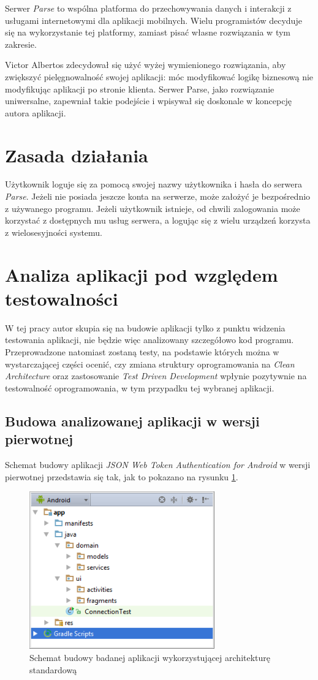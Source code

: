 Serwer \textit{Parse} to wspólna platforma do przechowywania danych i interakcji z usługami internetowymi dla aplikacji mobilnych. Wielu programistów decyduje się na wykorzystanie tej platformy, zamiast pisać własne rozwiązania w tym zakresie.

Victor Albertos zdecydował się użyć wyżej wymienionego rozwiązania, aby zwiększyć pielęgnowalność swojej aplikacji: móc modyfikować logikę biznesową nie modyfikując aplikacji po stronie klienta. Serwer Parse, jako rozwiązanie uniwersalne, zapewniał takie podejście i wpisywał się doskonale w koncepcję autora aplikacji.

\section{Zasada działania}
Użytkownik loguje się za pomocą swojej nazwy użytkownika i hasła do serwera \textit{Parse}. Jeżeli nie posiada jeszcze konta na serwerze, może założyć je bezpośrednio z używanego programu. Jeżeli użytkownik istnieje, od chwili zalogowania może korzystać z dostępnych mu usług serwera, a logując się z wielu urządzeń korzysta z wielosesyjności systemu. 

\section{Analiza aplikacji pod względem testowalności}
W tej pracy autor skupia się na budowie aplikacji tylko z punktu widzenia testowania aplikacji, nie będzie więc analizowany szczegółowo kod programu. Przeprowadzone natomiast zostaną testy, na podstawie których można w wystarczającej części ocenić, czy zmiana struktury oprogramowania na \textit{Clean Architecture} oraz zastosowanie  \textit{Test Driven Development} wpłynie pozytywnie na testowalność oprogramowania, w tym przypadku tej wybranej aplikacji.

\newpage
\subsection{Budowa analizowanej aplikacji w wersji pierwotnej}
Schemat budowy aplikacji \textit{JSON Web Token Authentication for Android} w wersji pierwotnej przedstawia się tak, jak to pokazano na rysunku \ref{fig:app_std}.

\begin{figure}[!htb]
    \centering
    \includegraphics[width=8cm]{imgs/ch6_app_st.png}
    \caption
{Schemat budowy badanej aplikacji wykorzystującej architekturę standardową}
    \label{fig:app_std}
\end{figure} 

